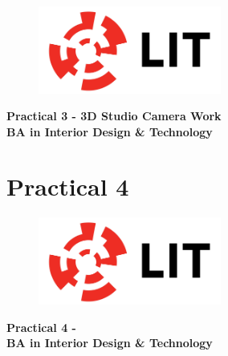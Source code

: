 \documentclass[a4paper, 10pt]{article}
\begin{document}
\newpage
\setcounter{page}{1}
\begin{center}
	\begin{figure}[ht]
		\centering
		\includegraphics[width = 6cm]{img/LITlogo.jpg}
		\label{fig:logoa3}
	\end{figure}
	\Large\textbf{Practical 3 - 3D Studio Camera Work}\\
	\large\textbf{BA in Interior Design \& Technology}
\end{center}












\newpage	
\section{Practical 4}

\newpage
\setcounter{page}{1}
\begin{center}
	\begin{figure}[ht]
		\centering
		\includegraphics[width = 6cm]{img/LITlogo.jpg}
		\label{fig:logoa4}
	\end{figure}
	\Large\textbf{Practical 4 - }\\
	\large\textbf{BA in Interior Design \& Technology}
\end{center}
\end{document}
